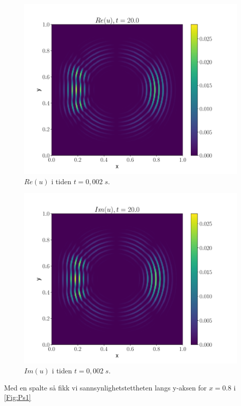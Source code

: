 \documentclass[reprint,english,notitlepage]{revtex4-2}  %
\begin{document}
\begin{figure}[H]
\centering
\includegraphics[scale=0.45, trim={3cm 0 0 0}]{../Images/ImshowRe0002sl1.pdf}
\caption{$Re(u) $ i tiden $t = 0,002 \; s$.}
\label{Fig:s2Ret02}
\end{figure}

\begin{figure}[H]
\centering
\includegraphics[scale=0.45, trim={3cm 0 0 0}]{../Images/ImshowIm0002sl1.pdf}
\caption{$Im(u) $ i tiden $t = 0,002 \; s$.}
\label{Fig:s2Imt02}
\end{figure}

Med en spalte så fikk vi sannsynlighetstettheten langs y-aksen for $x = 0.8$ i \autoref{Fig:Ps1}
\end{document}
